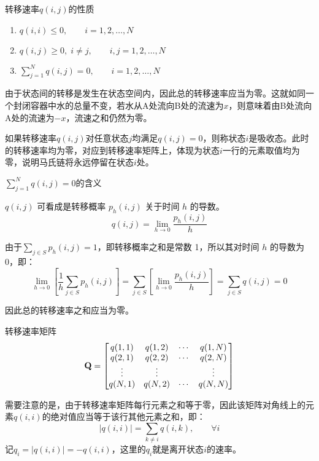 \documentclass[t]{beamer}
\begin{document}
\begin{frame}{转移速率$q(i,j)$的性质}
  \begin{enumerate}
    \item $q(i,i)\le 0,\qquad i=1,2,\ldots,N$
    \item $q(i,j)\ge 0,\; i\ne j,\qquad i,j=1,2,\ldots,N$
    \item $\sum^N_{j=1}q(i,j)=0,\qquad i=1,2,\ldots,N$
  \end{enumerate}

  由于状态间的转移是发生在状态空间内，因此总的转移速率应当为零。这就如同一个封闭容器中水的总量不变，若水从A处流向B处的流速为$x$，则意味着由B处流向A处的流速为$-x$，流速之和仍然为零。

如果转移速率$q(i,j)$对任意状态$j$均满足$q(i,j)=0$，则称状态$i$是吸收态。此时的转移速率均为零，对应到转移速率矩阵上，体现为状态$i$一行的元素取值均为零，说明马氏链将永远停留在状态$i$处。
\end{frame}

\begin{frame}{$\sum^N_{j=1}q(i,j)=0$的含义}

$q(i,j)$ 可看成是转移概率 $p_h (i,j)$ 关于时间 $h$ 的导数。
\[q(i,j)=\lim_{h\to 0}\frac{p_h(i,j)}{h}\]

由于$\sum_{j\in S}p_h(i,j)=1$，即转移概率之和是常数
1，所以其对时间 $h$ 的导数为 0，即：
\[\lim_{h\to 0}\left[\frac{1}{h}\sum_{j\in S}p_h(i,j)\right]=\sum_{j\in S}\left[\lim_{h\to 0}\frac{p_h(i,j)}{h}\right]=\sum_{j\in S}q(i,j)=0\]

因此总的转移速率之和应当为零。
\end{frame}

\begin{frame}{转移速率矩阵}
  \[{\bf Q}=\begin{bmatrix}
    q(1,1) & q(1,2) & \cdots & q(1,N)\\
    q(2,1) & q(2,2) & \cdots & q(2,N)\\
    \vdots & \vdots &  & \vdots\\
    q(N,1) & q(N,2) & \cdots & q(N,N)\\
    \end{bmatrix} \]
    
    需要注意的是，由于转移速率矩阵每行元素之和等于零，因此该矩阵对角线上的元素$q(i,i)$的绝对值应当等于该行其他元素之和，即：
    \[|q(i,i)|=\sum_{k\ne i}q(i,k),\qquad \forall i \]
    记$q_i=|q(i,i)|=-q(i,i)$，这里的$q_i$就是离开状态$i$的速率。
    
\end{frame}
\end{document}
